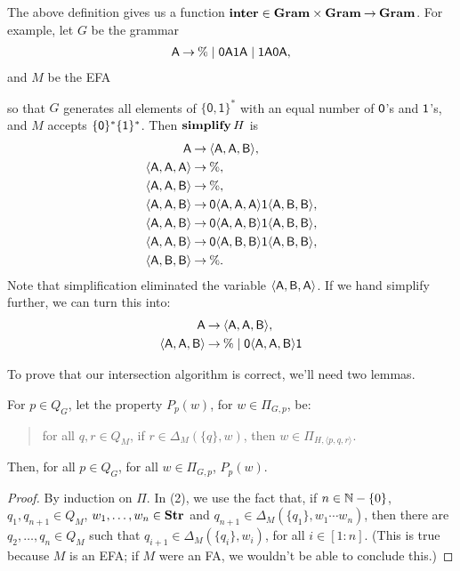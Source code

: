 The above definition gives us a function
$\mathbf{inter}\in\mathbf{Gram}\times\mathbf{Gram}\mathbin{\to}\mathbf{Gram}$.  For example, let $G$ be the
grammar
\begin{gather*}
  \mathsf{A} \mathbin{\to} \% \mid \mathsf{0A1A} \mid \mathsf{1A0A} ,
\end{gather*}
and $M$ be the EFA
\begin{center}
  
\end{center}
so that $G$ generates all elements of $\{\mathsf{0,1}\}^*$
with an equal number of $\mathsf{0}$'s and $\mathsf{1}$'s, and $M$
accepts $\{\mathsf{0}\}^*\{\mathsf{1}\}^*$.
Then $\mathbf{simplify}\,H$ is
\begin{align*}
\mathsf{A} &\mathbin{\to} \langle\mathsf{A},\mathsf{A},\mathsf{B}\rangle , \\
\langle\mathsf{A},\mathsf{A},\mathsf{A}\rangle &\mathbin{\to} \% , \\
\langle\mathsf{A},\mathsf{A},\mathsf{B}\rangle &\mathbin{\to} \% , \\
\langle\mathsf{A},\mathsf{A},\mathsf{B}\rangle &\mathbin{\to}
\mathsf{0}\langle\mathsf{A},\mathsf{A},\mathsf{A}\rangle\mathsf{1}\langle\mathsf{A},\mathsf{B},\mathsf{B}\rangle , \\
\langle\mathsf{A},\mathsf{A},\mathsf{B}\rangle &\mathbin{\to}
\mathsf{0}\langle\mathsf{A},\mathsf{A},\mathsf{B}\rangle\mathsf{1}\langle\mathsf{A},\mathsf{B},\mathsf{B}\rangle , \\
\langle\mathsf{A},\mathsf{A},\mathsf{B}\rangle &\mathbin{\to}
\mathsf{0}\langle\mathsf{A},\mathsf{B},\mathsf{B}\rangle\mathsf{1}\langle\mathsf{A},\mathsf{B},\mathsf{B}\rangle , \\
\langle\mathsf{A},\mathsf{B},\mathsf{B}\rangle &\mathbin{\to} \% .
\end{align*}
Note that simplification eliminated the variable
$\langle\mathsf{A},\mathsf{B},\mathsf{A}\rangle$.
If we hand simplify further, we can turn this into:
\begin{align*}
\mathsf{A} &\mathbin{\to} \langle\mathsf{A},\mathsf{A},\mathsf{B}\rangle , \\
\langle\mathsf{A},\mathsf{A},\mathsf{B}\rangle &\mathbin{\to}
\% \mid \mathsf{0}\langle\mathsf{A},\mathsf{A},\mathsf{B}\rangle\mathsf{1}
\end{align*}

To prove that our intersection algorithm is correct, we'll need two
lemmas.

\begin{lemma}
\label{GramEFAInter1}
For $p\in Q_G$, let the property $P_p(w)$, for $w\in\Pi_{G,p}$, be:
\begin{quotation}
\noindent
for all $q,r\in Q_M$, if $r\in\Delta_M(\{q\},w)$, then
$w\in\Pi_{H,\langle p, q, r\rangle}$.
\end{quotation}
Then, for all $p\in Q_G$, for all $w\in\Pi_{G,p}$, $P_p(w)$.
\end{lemma}

\begin{proof}
By induction on $\Pi$. In (2), we use the fact that, if
$n\in\mathbb{N}-\{0\}$, $q_1,q_{n+1}\in Q_M$,
$w_1,\ldots,w_n\in\mathbf{Str}$ and
$q_{n+1}\in\Delta_M(\{q_1\}, w_1\cdots w_n)$, then
there are $q_2,\ldots,q_n\in Q_M$ such that
$q_{i+1}\in\Delta_M(\{q_i\}, w_i)$, for all $i\in[1:n]$. (This is
true because $M$ is an EFA; if $M$ were an FA, we wouldn't be able to
conclude this.)
\end{proof}

